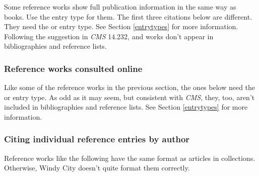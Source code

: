 \documentclass[11pt,letterpaper,oneside]{article}
\begin{document}
Some reference works show full publication information in the same way
as books. Use the  entry type for them. The first three
citations below are different. They need the  or
 entry type. See Section \ref{entrytypes} for
more information. Following the suggestion in \textit{CMS} 14.232,
 and  works don't appear in
bibliographies and reference lists.

\begin{citebib}
\item \cite{salvation1980}
\item \cite{hootananny2009}
\item \cite{dab1937}
\item \cite[s.vv. \mkbibquote{police ranks}, \mkbibquote{postal addresses}]{timestyle2003}
\item \cite[6.8.2]{mla2008}
\end{citebib}

\subsubsection{Reference works consulted online}

Like some of the reference works in the previous section, the ones
below need the  or  entry
type. As odd as it may seem, but consistent with \textit{CMS}, they,
too, aren't included in bibliographies and reference lists. See
Section \ref{entrytypes} for more information.

\begin{citeonly}
\item \cite{toscanini2016}
\item \cite{cairns2016}
\item \cite{wikipedia2016}
\item \cite{merriam2016}
\end{citeonly}

\subsubsection{Citing individual reference entries by author}

Reference works like the following have the same format as articles in
collections. Otherwise, Windy City doesn't quite format them
correctly.

\begin{citebib}
\item \cite{isaacson2005}
\end{citebib}
\end{document}

